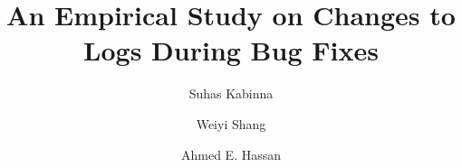  
 \documentclass[smallextended]{svjour3}       %
 



%
\title{An Empirical Study on Changes to Logs During Bug Fixes}

\author{Suhas Kabinna         \and
	Weiyi Shang \and
	Ahmed E. Hassan
}


